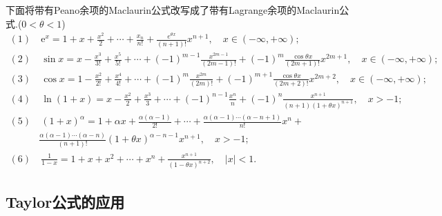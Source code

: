 下面将带有Peano余项的Maclaurin公式改写成了带有Lagrange余项的Maclaurin公式.($0<\theta<1$)
\begin{align*}
	(1)&\ \text{e}^x=1+x+\frac{x^2}{2}+\cdots+\frac{x_n}{n!}+\frac{e^{\theta x}}{(n+1)!}x^{n+1},\quad x\in(-\infty,+\infty);\\
	(2)&\ \sin x=x-\frac{x^3}{3!}+\frac{x^5}{5!}+\cdots+(-1)^{m-1}\frac{x^{2m-1}}{(2m-1)!}+(-1)^m\frac{\cos \theta x}{(2m+1)!}x^{2m+1},\quad x\in(-\infty,+\infty);\\
	(3)&\ \cos x=1-\frac{x^2}{2!}+\frac{x^4}{4!}+\cdots+(-1)^m\frac{x^{2m}}{(2m)!}+(-1)^{m+1}\frac{\cos \theta x}{(2m+2)!}x^{2m+2},\quad x\in(-\infty,+\infty);\\
	(4)&\ \ln(1+x)=x-\frac{x^2}{2}+\frac{x^3}{3}+\cdots+(-1)^{n-1}\frac{x^n}{n}+(-1)^n\frac{x^{n+1}}{(n+1)(1+\theta x)^{n+1}},\quad x>-1;\\
	(5)&\ (1+x)^\alpha=1+\alpha x+\frac{\alpha(\alpha-1)}{2!}+\cdots+\frac{\alpha(\alpha-1)\cdots(\alpha-n+1)}{n!}x^n+\\
	&\frac{\alpha(\alpha-1)\cdots(\alpha-n)}{(n+1)!}(1+\theta x)^{\alpha-n-1}x^{n+1},\quad x>-1;\\
	(6)&\ \frac{1}{1-x}=1+x+x^2+\cdots+x^n+\frac{x^{n+1}}{(1-\theta x)^{n+2}},\quad |x|<1.&
\end{align*}
\subsection{Taylor公式的应用}
